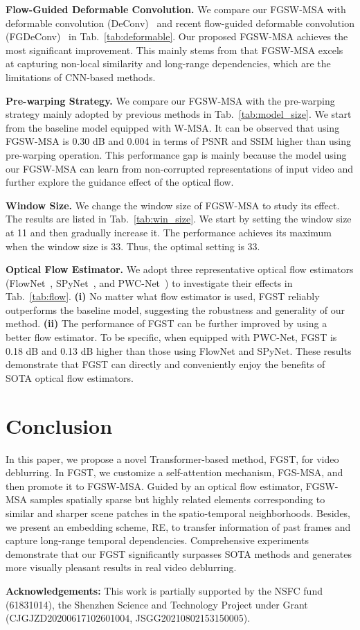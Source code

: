 \documentclass{article}
\begin{document}
	\noindent\textbf{Flow-Guided Deformable Convolution.} We compare our FGSW-MSA with deformable convolution (DeConv)~\cite{edvr} and recent flow-guided deformable convolution (FGDeConv)~\cite{chan2021basicvsr++} in Tab.~\ref{tab:deformable}. Our proposed FGSW-MSA achieves the most significant improvement. This mainly stems from that FGSW-MSA excels at capturing non-local similarity and long-range dependencies, which are the limitations of CNN-based methods.
	
	\noindent\textbf{Pre-warping Strategy.} We compare our FGSW-MSA with the pre-warping strategy mainly adopted by previous methods in Tab.~\ref{tab:model_size}. We start from the baseline model equipped with W-MSA. It can be observed that using FGSW-MSA is 0.30 dB and 0.004 in terms of PSNR and SSIM higher than using pre-warping operation. This performance gap is mainly because the model using our FGSW-MSA can learn from non-corrupted representations of input video and further  explore the guidance effect of the optical flow.
	
	\noindent\textbf{Window Size.} We change the window size of FGSW-MSA to study its effect. The results are listed in Tab.~\ref{tab:win_size}. We start by setting the window size at 11 and then gradually increase it. The performance  achieves its maximum when the window size is 33. Thus, the optimal setting is 33.
	
	
	
	\noindent\textbf{Optical Flow Estimator.} We adopt three representative optical flow estimators (FlowNet~\cite{flownet}, SPyNet~\cite{spynet}, and PWC-Net~\cite{pwcnet}) to investigate their effects in Tab.~\ref{tab:flow}. \textbf{(i)} No matter what flow estimator is used, FGST reliably outperforms the baseline model, suggesting the robustness and generality of our method. \textbf{(ii)} The performance of FGST can be further improved by using a better flow estimator. To be specific, when equipped with PWC-Net, FGST is 0.18 dB and 0.13 dB higher than those using FlowNet and SPyNet. These results demonstrate that FGST can directly and conveniently enjoy the benefits of SOTA optical flow estimators.
	
	\vspace{-2mm}
	\section{Conclusion}
	\vspace{-1mm}
	In this paper, we propose a novel  Transformer-based method, FGST, for video deblurring. In FGST, we customize a self-attention mechanism, FGS-MSA, and then promote it to FGSW-MSA. Guided by an optical flow estimator, FGSW-MSA samples spatially sparse but highly related  elements corresponding to similar and sharper scene patches in the spatio-temporal neighborhoods. Besides, we present an embedding scheme, RE, to transfer information of past frames and capture long-range temporal dependencies. Comprehensive experiments demonstrate that our FGST significantly surpasses SOTA methods and generates more visually pleasant results in real video deblurring.
	
	
	\textbf{Acknowledgements:} This work is partially supported by the NSFC fund (61831014), the Shenzhen Science and Technology Project under Grant (CJGJZD20200617102601004, JSGG20210802153150005).
	
	
	
\end{document}
